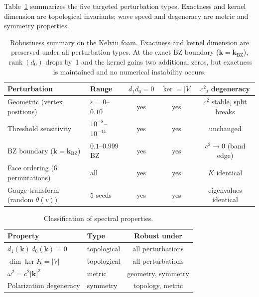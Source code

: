 \documentclass[preprint,12pt]{elsarticle}
\begin{document}
Table~\ref{tab:robustness} summarizes the five targeted perturbation types. Exactness and kernel dimension are topological invariants; wave speed and degeneracy are metric and symmetry properties.

\begin{table}[h]
\centering
\begin{tabular}{llccc}
\toprule
Perturbation & Range & $d_1 d_0 = 0$ & $\ker = |V|$ & $c^2$, degeneracy \\
\midrule
Geometric (vertex positions) & $\varepsilon = 0$--$0.10$ & yes & yes & $c^2$ stable, split breaks \\
Threshold sensitivity & $10^{-8}$--$10^{-14}$ & yes & yes & unchanged \\
BZ boundary ($\mathbf{k} = \mathbf{k}_{\mathrm{BZ}}$) & $0.1$--$0.999$ BZ & yes & yes & $c^2 \to 0$ (band edge) \\
Face ordering (6 permutations) & all & yes & yes & $K$ identical \\
Gauge transform (random $\theta(v)$) & 5 seeds & yes & yes & eigenvalues identical \\
\bottomrule
\end{tabular}
\caption{Robustness summary on the Kelvin foam. Exactness and kernel dimension are preserved under all perturbation types. At the exact BZ boundary ($\mathbf{k} = \mathbf{k}_{\mathrm{BZ}}$), $\operatorname{rank}(d_0)$ drops by~1 and the kernel gains two additional zeros, but exactness is maintained and no numerical instability occurs.}
\label{tab:robustness}
\end{table}

\begin{table}[h]
\centering
\begin{tabular}{llc}
\toprule
Property & Type & Robust under \\
\midrule
$d_1(\mathbf{k})\,d_0(\mathbf{k}) = 0$ & topological & all perturbations \\
$\dim\ker K = |V|$ & topological & all perturbations \\
$\omega^2 = c^2|\mathbf{k}|^2$ & metric & geometry, symmetry \\
Polarization degeneracy & symmetry & topology, metric \\
\bottomrule
\end{tabular}
\caption{Classification of spectral properties.}
\label{tab:classification}
\end{table}

\end{document}
